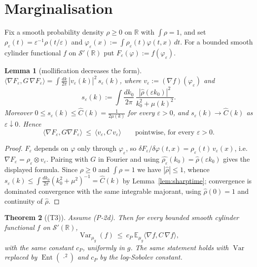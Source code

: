 \documentclass[11pt,a4paper]{article}
\theoremstyle{plain}
\newtheorem{theorem}{Theorem}[section]
\newtheorem{lemma}[theorem]{Lemma}
\theoremstyle{definition}
\newcommand{\R}{\mathbb{R}}
\newcommand{\E}{\mathbb{E}}
\newcommand{\Sw}{\mathcal S'}
\newcommand{\ip}[2]{\langle #1,#2\rangle}
\DeclareMathOperator{\Var}{Var}
\DeclareMathOperator{\Ent}{Ent}
\begin{document}
\section{Marginalisation}

Fix a smooth probability density $\rho\ge0$ on $\R$ with $\int\rho=1$, and set
$\rho_\varepsilon(t)=\varepsilon^{-1}\rho(t/\varepsilon)$ and
$\varphi_\varepsilon(x):=\int\rho_\varepsilon(t)\varphi(t,x)\,dt$. For a bounded smooth cylinder
functional $f$ on $\Sw(\R)$ put $F_\varepsilon(\varphi):=f(\varphi_\varepsilon)$.

\begin{lemma}[mollification decreases the form]\label{lem:moll}
$\displaystyle \ip{\nabla F_\varepsilon}{G\,\nabla F_\varepsilon}
 =\int\frac{dk}{2\pi}\,|\widehat{v_\varepsilon}(k)|^2\,s_\varepsilon(k)$, where
$v_\varepsilon:=(\nabla f)(\varphi_\varepsilon)$ and
\[
  s_\varepsilon(k):=\int\frac{dk_0}{2\pi}\,\frac{|\hat\rho(\varepsilon k_0)|^2}{k_0^2+\mu(k)^2} .
\]
Moreover $0\le s_\varepsilon(k)\le\widehat C(k)=\tfrac1{2\mu(k)}$ for every $\varepsilon>0$, and
$s_\varepsilon(k)\to\widehat C(k)$ as $\varepsilon\downarrow0$. Hence
\begin{equation}\label{eq:dominate}
  \ip{\nabla F_\varepsilon}{G\nabla F_\varepsilon}\ \le\ \ip{v_\varepsilon}{C\,v_\varepsilon}
  \qquad\text{pointwise, for every }\varepsilon>0 .
\end{equation}
\end{lemma}

\begin{proof}
$F_\varepsilon$ depends on $\varphi$ only through $\varphi_\varepsilon$, so
$\delta F_\varepsilon/\delta\varphi(t,x)=\rho_\varepsilon(t)\,v_\varepsilon(x)$, i.e.
$\nabla F_\varepsilon=\rho_\varepsilon\otimes v_\varepsilon$. Pairing with $G$ in Fourier and using
$\widehat{\rho_\varepsilon}(k_0)=\hat\rho(\varepsilon k_0)$ gives the displayed formula. Since
$\rho\ge0$ and $\int\rho=1$ we have $|\hat\rho|\le1$, whence
$s_\varepsilon(k)\le\int\frac{dk_0}{2\pi}(k_0^2+\mu^2)^{-1}=\widehat C(k)$ by
Lemma~\ref{lem:sharptime}; convergence is dominated convergence with the same integrable majorant,
using $\hat\rho(0)=1$ and continuity of $\hat\rho$.
\end{proof}

\begin{theorem}[(T3)]\label{thm:T3}
Assume \textup{(P-2d)}. Then for every bounded smooth cylinder functional $f$ on $\Sw(\R)$,
\[
  \Var_{\mu_g}(f)\ \le\ c_P\ \E_{\mu_g}\ip{\nabla f}{C\,\nabla f} ,
\]
with the \emph{same} constant $c_P$, uniformly in $g$. The same statement holds with $\Var$
replaced by $\Ent(\,\cdot^2)$ and $c_P$ by the log-Sobolev constant.
\end{theorem}
\end{document}

